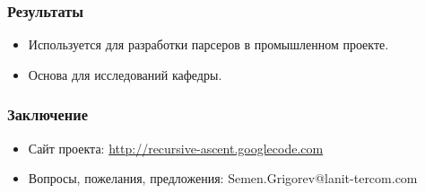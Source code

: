 \documentclass{beamer}
\begin{document}
\author[Григорьев Семён]{}

\begin{frame}
	\transwipe[direction=90]
	\frametitle{Результаты}
	\begin{itemize}
        \item Используется для разработки парсеров в промышленном проекте.
        \item Основа для исследований кафедры.
    \end{itemize}    
\end{frame}


\begin{frame}
	\transwipe[direction=90]
	\frametitle{Заключение}
	\begin{itemize}
        \item Сайт проекта: \href{http://recursive-ascent.googlecode.com} {http://recursive-ascent.googlecode.com}
	    \item Вопросы, пожелания, предложения: Semen.Grigorev@lanit-tercom.com
    \end{itemize}    
\end{frame}    
    
\end{document}
